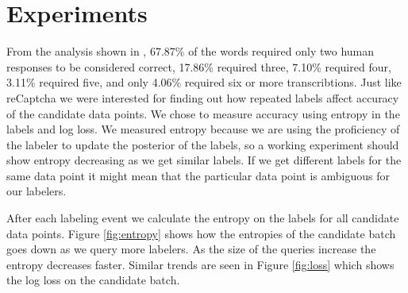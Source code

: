 \documentclass[twoside,11pt]{article}
\begin{document}


\section{Experiments}

From the analysis shown in \cite{recaptcha}, 67.87\% of the words required only two human responses to be considered correct, 17.86\% required three, 7.10\% required four, 3.11\% required five, and only 4.06\% required six or more transcribtions. Just like reCaptcha we were interested for finding out how repeated labels affect accuracy of the candidate data points. We chose to measure accuracy using entropy in the labels and log loss. We measured entropy because we are using the proficiency of the labeler to update the posterior of the labels, so a working experiment should show entropy decreasing as we get similar labels. If we get different labels for the same data point it might mean that the particular data point is ambiguous for our labelers.

After each labeling event we calculate the entropy on the labels for all candidate data points. Figure \ref{fig:entropy} shows how the entropies of the candidate batch goes down as we query more labelers. As the size of the queries increase the entropy decreases faster. Similar trends are seen in Figure \ref{fig:loss} which shows the log loss on the candidate batch.
\end{document}
